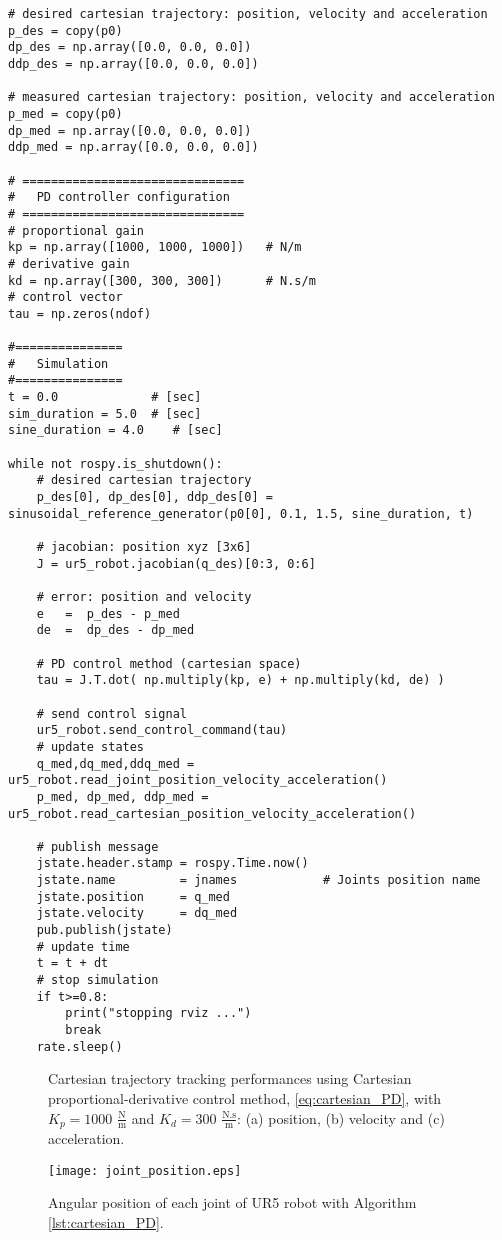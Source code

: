 \begin{lstlisting}
# desired cartesian trajectory: position, velocity and acceleration
p_des = copy(p0)
dp_des = np.array([0.0, 0.0, 0.0])
ddp_des = np.array([0.0, 0.0, 0.0])

# measured cartesian trajectory: position, velocity and acceleration
p_med = copy(p0)
dp_med = np.array([0.0, 0.0, 0.0])
ddp_med = np.array([0.0, 0.0, 0.0])

# ===============================
#   PD controller configuration
# ===============================
# proportional gain
kp = np.array([1000, 1000, 1000])   # N/m
# derivative gain   
kd = np.array([300, 300, 300])      # N.s/m
# control vector
tau = np.zeros(ndof)    

#===============
#   Simulation
#===============
t = 0.0             # [sec] 
sim_duration = 5.0  # [sec]
sine_duration = 4.0    # [sec]

while not rospy.is_shutdown():
    # desired cartesian trajectory
    p_des[0], dp_des[0], ddp_des[0] = sinusoidal_reference_generator(p0[0], 0.1, 1.5, sine_duration, t)

    # jacobian: position xyz [3x6]
    J = ur5_robot.jacobian(q_des)[0:3, 0:6]     
    
    # error: position and velocity
    e 	=  p_des - p_med
    de 	=  dp_des - dp_med    

    # PD control method (cartesian space)
    tau = J.T.dot( np.multiply(kp, e) + np.multiply(kd, de) )
    
    # send control signal
    ur5_robot.send_control_command(tau)
    # update states
    q_med,dq_med,ddq_med = ur5_robot.read_joint_position_velocity_acceleration()
    p_med, dp_med, ddp_med = ur5_robot.read_cartesian_position_velocity_acceleration()

    # publish message
    jstate.header.stamp = rospy.Time.now()
    jstate.name 		= jnames			# Joints position name
    jstate.position 	= q_med
    jstate.velocity 	= dq_med
    pub.publish(jstate)
    # update time
    t = t + dt
    # stop simulation
    if t>=0.8:
        print("stopping rviz ...")
        break
    rate.sleep()
\end{lstlisting}

\begin{figure}%
	\centering
	\caption{Cartesian trajectory tracking performances using Cartesian proportional-derivative control method, \eqref{eq:cartesian_PD}, with  ${K_{p}}=1000$ $\mathrm{\frac{N}{m}}$ and $K_{d}= 300$ $\mathrm{\frac{N.s}{m}}$: (a) position, (b) velocity and (c) acceleration.}
	\label{fig:act_1.4_ee_position}
\end{figure}

\begin{figure}
    \centering
    \texttt{[image: joint\_position.eps]}	
    \caption{Angular position of each joint of UR5 robot with Algorithm \ref{lst:cartesian_PD}.}
    \label{fig:act_1.4_joint_position}
\end{figure}
